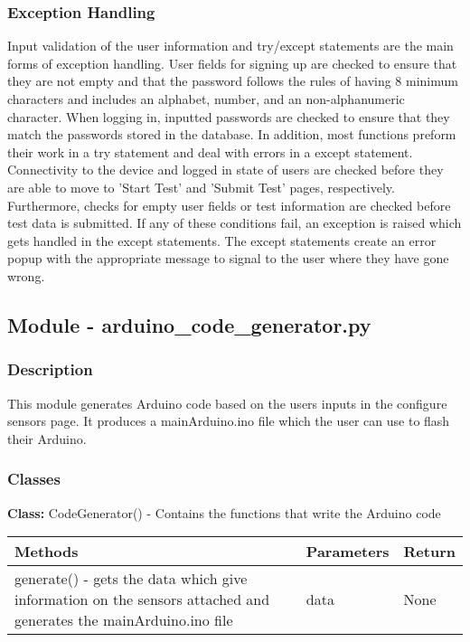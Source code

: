\documentclass[12pt, titlepage]{article}
\begin{document}
  \subsubsection{Exception Handling}
  Input validation of the user information and try/except statements are the main forms of exception handling. 
  User fields for signing up are checked to ensure that they are not empty and that the password follows the 
  rules of having 8 minimum characters and includes an alphabet, number, and an non-alphanumeric character. 
  When logging in, inputted passwords are checked to ensure that they match the passwords stored in the database.
  In addition, most functions preform their work in a try statement and deal with errors in a except statement.
  Connectivity to the device and logged in state of users are checked before they are able to move to 'Start Test' and 'Submit Test' pages, respectively.
  Furthermore, checks for empty user fields or test information are checked before test data is submitted. If any of these conditions fail, an exception
  is raised which gets handled in the except statements. The except statements create an error popup with the appropriate message to signal to the user
  where they have gone wrong.  

  \subsection{Module - arduino\_code\_generator.py}
  \subsubsection{Description}
  This module generates Arduino code based on the users inputs in the configure sensors page. It produces a mainArduino.ino file which the user can use to flash their Arduino.
  \subsubsection{Classes}
    \textbf{Class:} CodeGenerator() - Contains the functions that write the Arduino code \\
    
      \noindent \begin{tabular}{| p{} | p{}| p{}|}
        \hline
        \rowcolor[gray]{0.9}
        Methods & Parameters & Return\\
        \hline
        generate() - gets the data which give information on the sensors attached and generates the mainArduino.ino file  & data & None \\
        \hline
      \end{tabular}
\end{document}
